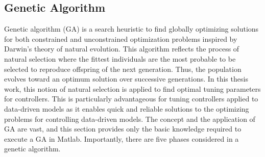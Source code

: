\subsection{Genetic Algorithm}
\label{sec:GA}
Genetic algorithm (GA) is a search heuristic to find globally optimizing solutions for both constrained and unconstrained optimization problems inspired by Darwin's theory of natural evolution. This algorithm reflects the process of natural selection where the fittest individuals are the most probable to be selected to reproduce offspring of the next generation. Thus, the population evolves toward an optimum solution over successive generations. In this thesis work, this notion of natural selection is applied to find optimal tuning parameters for controllers. This is particularly advantageous for tuning controllers applied to data-driven models as it enables quick and reliable solutions to the optimizing problems for controlling data-driven models. The concept and the application of GA are vast, and this section provides only the basic knowledge required to execute a GA in Matlab. Importantly, there are five phases considered in a genetic algorithm.
